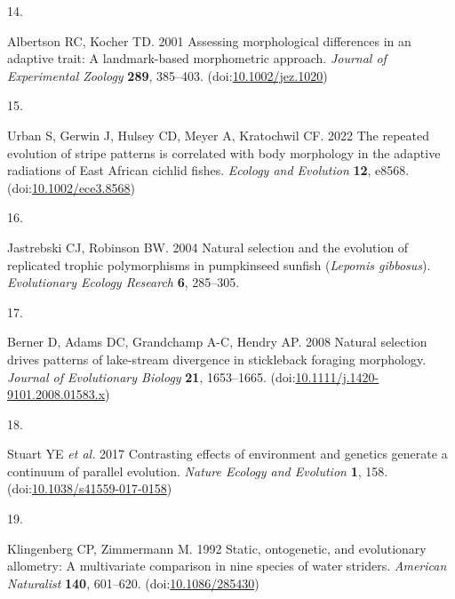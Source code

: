 \documentclass[
  11pt,
]{article}
\newlength{\cslhangindent}
\newlength{\csllabelwidth}
\newlength{\cslentryspacingunit} %
\newenvironment{CSLReferences}[2] %
 {%
  \setlength{\parindent}{0pt}
  \ifodd #1
  \let\oldpar\par
  \def\par{\hangindent=\cslhangindent\oldpar}
  \fi
  \setlength{\parskip}{#2\cslentryspacingunit}
 }%
 {}
\newcommand{\CSLLeftMargin}[1]{\parbox[t]{\csllabelwidth}{#1}}
\newcommand{\CSLRightInline}[1]{\parbox[t]{\linewidth - \csllabelwidth}{#1}\break}
\providecommand{\DIFaddbegin}{} %
\providecommand{\DIFaddend}{} %
\providecommand{\DIFdelbegin}{} %
\providecommand{\DIFdelend}{} %
\newcommand{\DIFscaledelfig}{0.5}
\newlength{\DIFdelgraphicswidth} %
\newlength{\DIFdelgraphicsheight} %
\newcommand{\DIFaddincludegraphics}[2][]{{\color{blue}\fbox{\DIFOincludegraphics[#1]{#2}}}} %
\newcommand{\DIFdelincludegraphics}[2][]{%
\sbox{\DIFdelgraphicsbox}{\DIFOincludegraphics[#1]{#2}}%
\settoboxwidth{\DIFdelgraphicswidth}{\DIFdelgraphicsbox} %
\settoboxtotalheight{\DIFdelgraphicsheight}{\DIFdelgraphicsbox} %
\scalebox{\DIFscaledelfig}{%
\parbox[b]{\DIFdelgraphicswidth}{\usebox{\DIFdelgraphicsbox}\\[-\baselineskip] \rule{\DIFdelgraphicswidth}{0em}}\llap{\resizebox{\DIFdelgraphicswidth}{\DIFdelgraphicsheight}{%
\setlength{\unitlength}{\DIFdelgraphicswidth}%
\begin{picture}(1,1)%
\thicklines\linethickness{2pt} %
{\color[rgb]{1,0,0}\put(0,0){\framebox(1,1){}}}%
{\color[rgb]{1,0,0}\put(0,0){\line( 1,1){1}}}%
{\color[rgb]{1,0,0}\put(0,1){\line(1,-1){1}}}%
\end{picture}%
}\hspace*{3pt}}} %
} %
\DeclareRobustCommand{\DIFaddbegin}{\DIFOaddbegin \let\includegraphics\DIFaddincludegraphics} %
\DeclareRobustCommand{\DIFaddend}{\DIFOaddend \let\includegraphics\DIFOincludegraphics} %
\DeclareRobustCommand{\DIFdelbegin}{\DIFOdelbegin \let\includegraphics\DIFdelincludegraphics} %
\DeclareRobustCommand{\DIFdelend}{\DIFOaddend \let\includegraphics\DIFOincludegraphics} %
\begin{document}
\begin{CSLReferences}{0}{0}
\leavevmode{}%
\CSLLeftMargin{14. }%
\CSLRightInline{Albertson RC, Kocher TD. 2001 Assessing morphological
differences in an adaptive trait: A landmark-based morphometric
approach. \emph{Journal of Experimental Zoology} \textbf{289}, 385--403.
(doi:\href{https://doi.org/10.1002/jez.1020}{10.1002/jez.1020})}

\leavevmode{}%
\CSLLeftMargin{15. }%
\DIFdelbegin %
\DIFdelend \DIFaddbegin \CSLRightInline{Urban S, Gerwin J, Hulsey CD, Meyer A, Kratochwil CF.
2022 The repeated evolution of stripe patterns is correlated with body
morphology in the adaptive radiations of {E}ast {A}frican cichlid
fishes. \emph{Ecology and Evolution} \textbf{12}, e8568.
(doi:\href{https://doi.org/10.1002/ece3.8568}{10.1002/ece3.8568})}
\DIFaddend 

\leavevmode{}%
\CSLLeftMargin{16. }%
\CSLRightInline{Jastrebski CJ, Robinson BW. 2004 Natural selection and
the evolution of replicated trophic polymorphisms in pumpkinseed sunfish
(\emph{{L}epomis gibbosus}). \emph{Evolutionary Ecology Research}
\textbf{6}, 285--305.}

\leavevmode{}%
\CSLLeftMargin{17. }%
\CSLRightInline{Berner D, Adams DC, Grandchamp A-C, Hendry AP. 2008
Natural selection drives patterns of lake-stream divergence in
stickleback foraging morphology. \emph{Journal of Evolutionary Biology}
\textbf{21}, 1653--1665.
(doi:\href{https://doi.org/10.1111/j.1420-9101.2008.01583.x}{10.1111/j.1420-9101.2008.01583.x})}

\leavevmode{}%
\CSLLeftMargin{18. }%
\CSLRightInline{Stuart YE \emph{et al.} 2017 Contrasting effects of
environment and genetics generate a continuum of parallel evolution.
\emph{Nature Ecology and Evolution} \textbf{1}, 158.
(doi:\href{https://doi.org/10.1038/s41559-017-0158}{10.1038/s41559-017-0158})}

\leavevmode{}%
\CSLLeftMargin{19. }%
\CSLRightInline{Klingenberg CP, Zimmermann M. 1992 Static, ontogenetic,
and evolutionary allometry: A multivariate comparison in nine species of
water striders. \emph{American Naturalist} \textbf{140}, 601--620.
(doi:\href{https://doi.org/10.1086/285430}{10.1086/285430})}


\end{CSLReferences}
\end{document}
